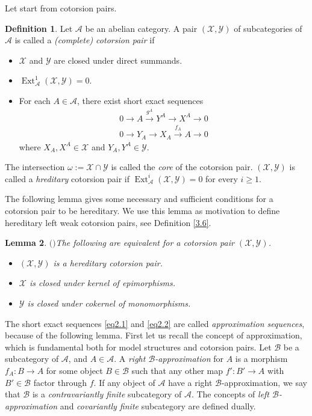 \documentclass[12pt]{amsart}
\numberwithin{equation}{section}
\newtheorem{lemma}{Lemma}[section]
\theoremstyle{definition}
\newtheorem{definition}[lemma]{Definition}
\DeclareMathOperator{\Ext}{Ext}
\newtheorem*{theorem 0*}{Theorem}
\newtheorem*{theorem a*}{Theorem A}
\newtheorem*{theorem b*}{Theorem B}
\numberwithin{diagram}{section}
\begin{document}
Let start from cotorsion pairs.
\begin{definition}\label{2.1}
Let $\mathcal{A}$ be an abelian category.
A pair $(\mathcal{X},\mathcal{Y})$ of subcategories of $\mathcal{A}$ is called a {\it (complete) cotorsion pair} if
    \begin{itemize}
    \item[(1)]
    $\mathcal{X}$ and $\mathcal{Y}$ are closed under direct summands.
    \item[(2)]
    $\Ext_{\mathcal{A}}^1(\mathcal{X},\mathcal{Y})=0$.
    \item[(3)]
    For each $A\in \mathcal{A}$, there exist short exact sequences
    \begin{align}
    0\rightarrow A\overset{g^A}{\longrightarrow} Y^A\longrightarrow X^A\rightarrow 0\label{eq2.1}\\
    0\rightarrow Y_A\longrightarrow X_A\overset{f_A}{\longrightarrow} A\rightarrow\label{eq2.2} 0
    \end{align}
    where $X_A,X^A\in \mathcal{X}$ and $Y_A,Y^A\in \mathcal{Y}$.
    \end{itemize}
    The intersection $\omega:=\mathcal{X}\cap\mathcal{Y}$ is called the {\it core} of the cotorsion pair.
    $(\mathcal{X},\mathcal{Y})$ is called a {\it hreditary} cotorsion pair if $\Ext_{\mathcal{A}}^i(\mathcal{X},\mathcal{Y})=0$ for every $i\geq 1$.
\end{definition}
The following lemma gives some necessary and sufficient conditions for a cotorsion pair to be hereditary.
We use this lemma as motivation to define hereditary left weak cotorsion pairs, see Definition \ref{3.6}.

\begin{lemma}$($\cite[6.17]{S}$)$\label{2.2}
The following are equivalent for a cotorsion pair $(\mathcal{X},\mathcal{Y})$.
\begin{itemize}
\item[(1)]
$(\mathcal{X},\mathcal{Y})$ is a hereditary cotorsion pair.
\item[(2)]
$\mathcal{X}$ is closed under kernel of epimorphisms.
\item[(3)]
$\mathcal{Y}$ is closed under cokernel of monomorphisms.
\end{itemize}
\end{lemma}
The short exact sequences \eqref{eq2.1} and \eqref{eq2.2} are called {\it approximation sequences}, because of the following lemma. First let us recall the concept of approximation, which is fundamental both for model structures and cotorsion pairs. Let $\mathcal{B}$ be a subcategory of $\mathcal{A}$, and $A\in\mathcal{A}$. A {\it right $\mathcal{B}$-approximation} for $A$ is a morphism $f_A:B\rightarrow A$ for some object $B\in \mathcal{B}$ such that any other map $f':B'\rightarrow A$ with $B'\in \mathcal{B}$ factor through $f$. If any object of $\mathcal{A}$ have a right $\mathcal{B}$-approximation, we say that $\mathcal{B}$ is a {\it contravariantly finite} subcategory of $\mathcal{A}$.
The concepts of {\it left $\mathcal{B}$-approximation} and {\it covariantly finite} subcategory are defined dually.
    
\end{document}

